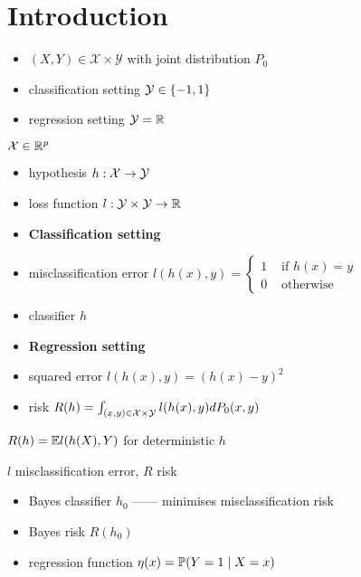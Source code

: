 \section{Introduction}\label{sec:introduction}

\begin{itemize}
    \item $(X,Y) \in \mathcal{X} \times \mathcal{Y}$ with joint distribution $P_0$
    \item classification setting $\mathcal{Y} \in \left\{ -1, 1 \right\}$
    \item regression setting $\mathcal{Y} = \mathbb{R}$
\end{itemize}

\begin{assumption}
    $\mathcal{X} \in \mathbb{R}^p$
\end{assumption}

\begin{itemize}
    \item hypothesis $h:\mathcal{X} \rightarrow \mathcal{Y}$
    \item loss function $l : \mathcal{Y} \times \mathcal{Y} \rightarrow \mathbb{R}$
    \item \textbf{Classification setting}
    \item misclassification error $l(h(x), y) = \begin{cases}
                                                    1 & \text{ if } h(x) = y\\
                                                    0 & \text{ otherwise }
    \end{cases}$
    \item classifier $h$
    \item \textbf{Regression setting}
    \item squared error $l(h(x), y) = (h(x) - y)^2$
    \item risk $R(h) = \int_{(x,y) \in \mathcal{X} \times \mathcal{Y}} l(h(x), y) dP_0(x,y)$
\end{itemize}

\begin{fact}
    $R(h) = \mathbb{E} l(h(X), Y)$ for deterministic $h$
\end{fact}

\begin{setting}
    $l$ misclassification error, $R$ risk
\end{setting}

\begin{itemize}
    \item Bayes classifier $h_0$ ------ minimises misclassification risk
    \item Bayes risk $R(h_0)$
    \item regression function $\eta(x) = \mathbb{P}(Y = 1\mid X= x)$
\end{itemize}

